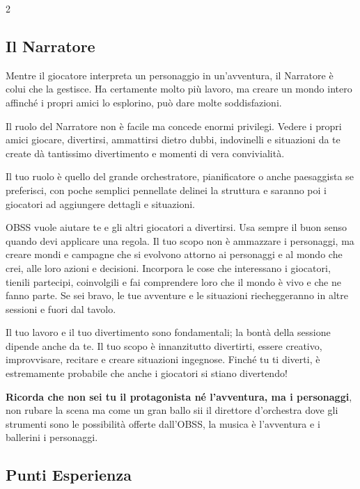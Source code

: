 \begin{multicols}{2}

\subsection{Il Narratore}

\label{il-narratore}

Mentre il giocatore interpreta un personaggio in un'avventura, il Narratore è colui che la gestisce. Ha certamente molto più lavoro, ma creare un mondo intero affinché i propri amici lo esplorino, può dare molte soddisfazioni.

Il ruolo del Narratore non è facile ma concede enormi privilegi. Vedere i propri amici giocare, divertirsi, ammattirsi dietro dubbi, indovinelli e situazioni da te create dà tantissimo divertimento e momenti di vera convivialità.

Il tuo ruolo è quello del grande orchestratore, pianificatore o anche paesaggista se preferisci, con poche semplici pennellate delinei la struttura e saranno poi i giocatori ad aggiungere dettagli e situazioni.

\begin{narratore}
OBSS vuole aiutare te e gli altri giocatori a divertirsi. Usa sempre il buon senso quando devi applicare una regola. Il tuo scopo non è ammazzare i personaggi, ma creare mondi e campagne che si evolvono attorno ai personaggi e al mondo che crei, alle loro azioni e decisioni. Incorpora le cose che interessano i giocatori, tienili partecipi, coinvolgili e fai comprendere loro che il mondo è vivo e che ne fanno parte. Se sei bravo, le tue avventure e le situazioni riecheggeranno in altre sessioni e fuori dal tavolo.
\end{narratore}

Il tuo lavoro e il tuo divertimento sono fondamentali; la bontà della sessione dipende anche da te. Il tuo scopo è innanzitutto divertirti, essere creativo, improvvisare, recitare e creare situazioni ingegnose. Finché tu ti diverti, è estremamente probabile che anche i giocatori si stiano divertendo!

\textbf{Ricorda che non sei tu il protagonista né l'avventura, ma i personaggi}, non rubare la scena ma come un gran ballo sii il direttore d'orchestra dove gli strumenti sono le possibilità offerte dall'OBSS, la musica è l'avventura e i ballerini i personaggi.

\subsection{Punti Esperienza}


\end{multicols}
